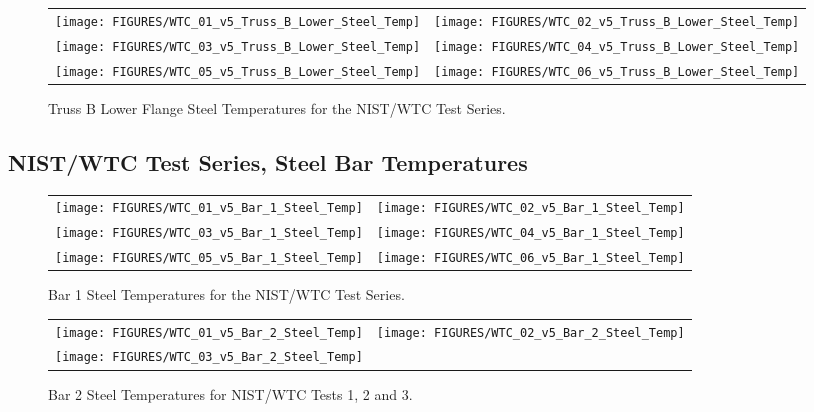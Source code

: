 \begin{figure}[p]
\begin{tabular*}{\textwidth}{l@{\extracolsep{\fill}}r}
\texttt{[image: FIGURES/WTC\_01\_v5\_Truss\_B\_Lower\_Steel\_Temp]} &
\texttt{[image: FIGURES/WTC\_02\_v5\_Truss\_B\_Lower\_Steel\_Temp]} \\
\texttt{[image: FIGURES/WTC\_03\_v5\_Truss\_B\_Lower\_Steel\_Temp]} &
\texttt{[image: FIGURES/WTC\_04\_v5\_Truss\_B\_Lower\_Steel\_Temp]} \\
\texttt{[image: FIGURES/WTC\_05\_v5\_Truss\_B\_Lower\_Steel\_Temp]} &
\texttt{[image: FIGURES/WTC\_06\_v5\_Truss\_B\_Lower\_Steel\_Temp]}
\end{tabular*}
\caption{Truss B Lower Flange Steel Temperatures for the NIST/WTC Test Series.}
\label{NIST_WTC_Truss_B_Lower_Steel}
\end{figure}

\clearpage


\subsection{NIST/WTC Test Series, Steel Bar Temperatures}

\vspace{1in}

\begin{figure}[h!]
\begin{tabular*}{\textwidth}{l@{\extracolsep{\fill}}r}
\texttt{[image: FIGURES/WTC\_01\_v5\_Bar\_1\_Steel\_Temp]} &
\texttt{[image: FIGURES/WTC\_02\_v5\_Bar\_1\_Steel\_Temp]} \\
\texttt{[image: FIGURES/WTC\_03\_v5\_Bar\_1\_Steel\_Temp]} &
\texttt{[image: FIGURES/WTC\_04\_v5\_Bar\_1\_Steel\_Temp]} \\
\texttt{[image: FIGURES/WTC\_05\_v5\_Bar\_1\_Steel\_Temp]} &
\texttt{[image: FIGURES/WTC\_06\_v5\_Bar\_1\_Steel\_Temp]}
\end{tabular*}
\caption{Bar 1 Steel Temperatures for the NIST/WTC Test Series.}
\label{NIST_WTC Bar_1_Steel}
\end{figure}

\begin{figure}[h!]
\begin{tabular*}{\textwidth}{l@{\extracolsep{\fill}}r}
\texttt{[image: FIGURES/WTC\_01\_v5\_Bar\_2\_Steel\_Temp]} &
\texttt{[image: FIGURES/WTC\_02\_v5\_Bar\_2\_Steel\_Temp]} \\
\texttt{[image: FIGURES/WTC\_03\_v5\_Bar\_2\_Steel\_Temp]} &
 \\
\end{tabular*}
\caption{Bar 2 Steel Temperatures for NIST/WTC Tests 1, 2 and 3.}
\label{NIST_WTC Bar_2_Steel}
\end{figure}



